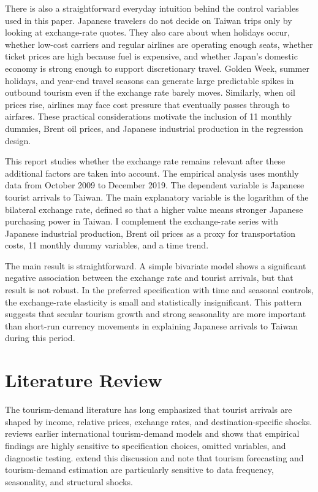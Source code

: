 \documentclass[12pt,a4paper]{article}
\begin{document}
There is also a straightforward everyday intuition behind the control variables used in this paper. Japanese travelers do not decide on Taiwan trips only by looking at exchange-rate quotes. They also care about when holidays occur, whether low-cost carriers and regular airlines are operating enough seats, whether ticket prices are high because fuel is expensive, and whether Japan's domestic economy is strong enough to support discretionary travel. Golden Week, summer holidays, and year-end travel seasons can generate large predictable spikes in outbound tourism even if the exchange rate barely moves. Similarly, when oil prices rise, airlines may face cost pressure that eventually passes through to airfares. These practical considerations motivate the inclusion of 11 monthly dummies, Brent oil prices, and Japanese industrial production in the regression design.

This report studies whether the exchange rate remains relevant after these additional factors are taken into account. The empirical analysis uses monthly data from October 2009 to December 2019. The dependent variable is Japanese tourist arrivals to Taiwan. The main explanatory variable is the logarithm of the bilateral exchange rate, defined so that a higher value means stronger Japanese purchasing power in Taiwan. I complement the exchange-rate series with Japanese industrial production, Brent oil prices as a proxy for transportation costs, 11 monthly dummy variables, and a time trend.

The main result is straightforward. A simple bivariate model shows a significant negative association between the exchange rate and tourist arrivals, but that result is not robust. In the preferred specification with time and seasonal controls, the exchange-rate elasticity is small and statistically insignificant. This pattern suggests that secular tourism growth and strong seasonality are more important than short-run currency movements in explaining Japanese arrivals to Taiwan during this period.

\section{Literature Review}

The tourism-demand literature has long emphasized that tourist arrivals are shaped by income, relative prices, exchange rates, and destination-specific shocks. \citet{lim1997} reviews earlier international tourism-demand models and shows that empirical findings are highly sensitive to specification choices, omitted variables, and diagnostic testing. \citet{songli2008} extend this discussion and note that tourism forecasting and tourism-demand estimation are particularly sensitive to data frequency, seasonality, and structural shocks.
\end{document}
